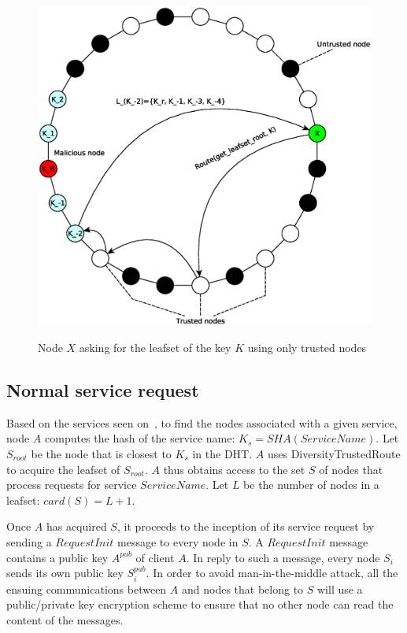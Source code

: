 \begin{figure}[!htb]
\centering
\includegraphics[width=14cm]{../img/secure_routing}\\
\caption{Node $X$ asking for the leafset of the key $K$ using only trusted nodes}
\label{fig:secure_routing}
\end{figure}


\subsection{Normal service request}

Based on the services seen on~\cite{p2p_certification}, to find the nodes associated with a given
service, node $A$ computes the hash
of the service name: $K_s = SHA(ServiceName)$. Let $S_{root} $ be the node that
is closest to $K_s$ in the DHT. $A$ uses DiversityTrustedRoute to acquire the
leafset of $S_{root}$. $A$ thus obtains access to the set $S$ of nodes that
process requests for service $ServiceName$. Let $L$ be the number of nodes in a
leafset: $card(S) = L + 1$.

Once $A$ has acquired $S$, it proceeds to the inception of its service request
by sending a $RequestInit$ message to every node in $S$. A $RequestInit$
message contains a public key $A^{pub}$ of client $A$. In reply to such a
message, every node $S_i$ sends its own public key $S^{pub}_i$. In order to
avoid man-in-the-middle attack, all the ensuing communications between $A$ and
nodes that belong to $S$ will use a public/private key encryption scheme to
ensure that no other node can read the content of the messages.


